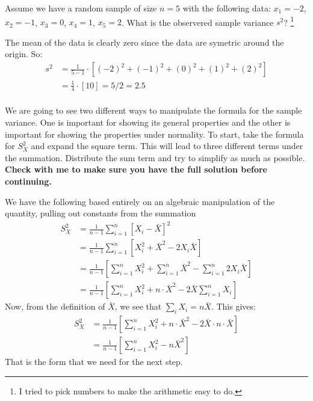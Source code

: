 
Assume we have a random sample of size $n = 5$ with the following data:
$x_1 = -2$, $x_2 = -1$, $x_3 = 0$, $x_4 = 1$, $x_5 = 2$. What is the observered
sample variance $s^2$? 
\footnote{
  I tried to pick numbers to make the arithmetic easy to do. 
}


The mean of the data is clearly zero since the data are symetric around the
origin. So:
\begin{align*}
s^2 &= \frac{1}{5 - 1} \cdot \left[(-2)^2 + (-1)^2 + (0)^2 + (1)^2 + (2)^2 \right] \\
&= \frac{1}{4} \cdot \left[10 \right] = 5/2 = 2.5 \\
\end{align*}


We are going to see two different ways to manipulate the formula for the 
sample variance. One is important for showing its general properties and
the other is important for showing the properties under normality. To start,
take the formula for $S^2_X$ and expand the square term. This will lead to
three different terms under the summation. Distribute the sum term and
try to simplify as much as possible. \textbf{Check with me to make sure
you have the full solution before continuing.}


We have the following based entirely on an algebraic manipulation of the
quantity, pulling out constants from the summation
\begin{align*}
S^2_X &= \frac{1}{n-1} \sum_{i=1}^n \left[X_i - \bar{X} \right]^2 \\
&= \frac{1}{n-1} \sum_{i=1}^n \left[X_i^2 + \bar{X}^2 - 2 X_i \bar{X} \right] \\
&= \frac{1}{n-1} \left[ \sum_{i=1}^n X_i^2 + \sum_{i=1}^n \bar{X}^2 - \sum_{i=1}^n 2 X_i \bar{X} \right] \\
&= \frac{1}{n-1} \left[ \sum_{i=1}^n X_i^2 + n \cdot \bar{X}^2 - 2 \bar{X} \sum_{i=1}^n X_i \right]
\end{align*}
Now, from the definition of $\bar{X}$, we see that $\sum_i X_i = n \bar{X}$.
This gives:
\begin{align*}
S^2_X &= \frac{1}{n-1} \left[ \sum_{i=1}^n X_i^2 + n \cdot \bar{X}^2 - 2 \bar{X} \cdot n \cdot \bar{X} \right] \\
&= \frac{1}{n-1} \left[ \sum_{i=1}^n X_i^2 - n \bar{X}^2 \right]
\end{align*}
That is the form that we need for the next step.

